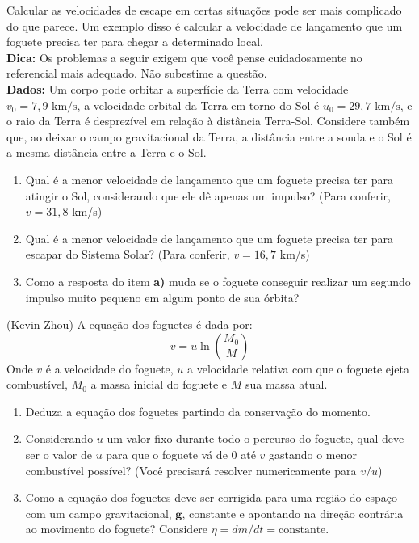 \documentclass[11pt]{article}
\begin{document}
\begin{pproblem} Calcular as velocidades de escape em certas situações pode ser mais complicado do que parece. Um exemplo disso é calcular a velocidade de lançamento que um foguete precisa ter para chegar a determinado local.
    \\
    \textbf{Dica:} Os problemas a seguir exigem que você pense cuidadosamente no referencial mais adequado. Não subestime a questão.
    \\
    \textbf{Dados:} Um corpo pode orbitar a superfície da Terra com velocidade \(v_0 = 7,9\text{ km/s}\), a velocidade orbital da Terra em torno do Sol é \(u_0 = 29,7\text{ km/s}\), e o raio da Terra é desprezível em relação à distância Terra-Sol. Considere também que, ao deixar o campo gravitacional da Terra, a distância entre a sonda e o Sol é a mesma distância entre a Terra e o Sol.
    \begin{enumerate}[label=\textbf{\alph*)}]
        \item Qual é a menor velocidade de lançamento que um foguete precisa ter para atingir o Sol, considerando que ele dê apenas um impulso? (Para conferir, \(v = 31,8\) km/s)
        \item Qual é a menor velocidade de lançamento que um foguete precisa ter para escapar do Sistema Solar? (Para conferir, \(v = 16,7\) km/s)
        \item Como a resposta do item \textbf{a)} muda se o foguete conseguir realizar um segundo impulso muito pequeno em algum ponto de sua órbita?
    \end{enumerate}

    
\end{pproblem}

\begin{pproblem} (Kevin Zhou) A equação dos foguetes é dada por:
    \[
    v = u\ln\left(\frac{M_0}{M}\right)
    \]
    Onde \(v\) é a velocidade do foguete, \(u\) a velocidade relativa com que o foguete ejeta combustível, \(M_0\) a massa inicial do foguete e \(M\) sua massa atual.
    \begin{enumerate}[label=\textbf{\alph*)}]
        \item Deduza a equação dos foguetes partindo da conservação do momento.
        \item Considerando \(u\) um valor fixo durante todo o percurso do foguete, qual deve ser o valor de \(u\) para que o foguete vá de \(0\) até \(v\) gastando o menor combustível possível? (Você precisará resolver numericamente para \(v/u\))
        \item Como a equação dos foguetes deve ser corrigida para uma região do espaço com um campo gravitacional, \(\mathbf{g}\), constante e apontando na direção contrária ao movimento do foguete? Considere \(\eta = dm/dt = \text{constante}\).
    \end{enumerate}

    
\end{pproblem}  
\end{document}
